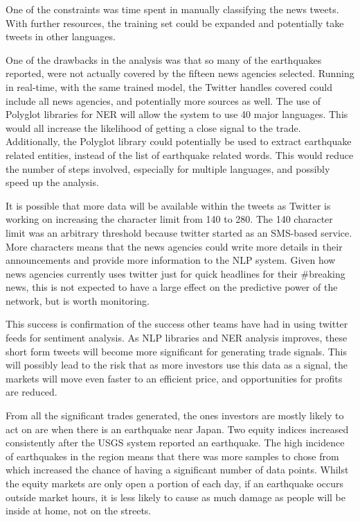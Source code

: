 One of the constraints was time spent in manually classifying the news tweets. With further resources, the training set could be expanded and potentially take tweets in other languages.

One of the drawbacks in the analysis was that so many of the earthquakes reported, were not actually covered by the fifteen news agencies selected. Running in real-time, with the same trained model, the Twitter handles covered could include all news agencies, and potentially more sources as well. The use of Polyglot libraries for NER will allow the system to use 40 major languages. This would all increase the likelihood of getting a close signal to the trade. Additionally, the Polyglot library could potentially be used to extract earthquake related entities, instead of the list of earthquake related words. This would reduce the number of steps involved, especially for multiple languages, and possibly speed up the analysis.

It is possible that more data will be available within the tweets as Twitter is working on increasing the character limit from 140 to 280. The 140 character limit was an arbitrary threshold because twitter started as an SMS-based service. More characters means that the news agencies could write more details in their announcements and provide more information to the NLP system. Given how news agencies currently uses twitter just for quick headlines for their \#breaking news, this is not expected to have a large effect on the predictive power of the network, but is worth monitoring.

This success is confirmation of the success other teams have had in using twitter feeds for sentiment analysis. As NLP libraries and NER analysis improves, these short form tweets will become more significant for generating trade signals. This will possibly lead to the risk that as more investors use this data as a signal, the markets will move even faster to an efficient price, and opportunities for profits are reduced.

From all the significant trades generated, the ones investors are mostly likely to act on are when there is an earthquake near Japan. Two equity indices increased consistently after the USGS system reported an earthquake. The high incidence of earthquakes in the region means that there was more samples to chose from which increased the chance of having a significant number of data points. Whilst the equity markets are only open a portion of each day, if an earthquake occurs outside market hours, it is less likely to cause as much damage as people will be inside at home, not on the streets.

